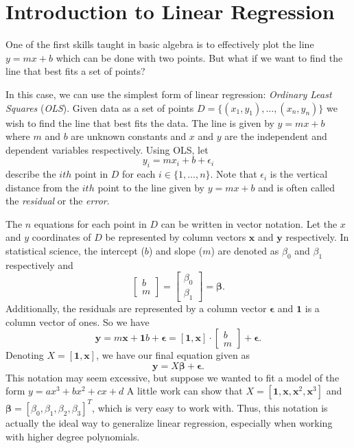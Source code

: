 \label{lab:LinearRegression}


\section*{Introduction to Linear Regression}
One of the first skills taught in basic algebra is to effectively plot the line $y=mx+b$ which can be done with two points. 
But what if we want to find the line that best fits a set of points?

In this case, we can use the simplest form of linear regression: \textit{Ordinary Least Squares} (\textit{OLS}). 
Given data as a set of points $D = \{ (x_1, y_1), \ldots, (x_n, y_n) \}$ we wish to find the line that best fits the data. 
The line is given by $y = mx+ b$ where $m$ and $b$ are unknown constants and $x$ and $y$ are the independent and dependent variables respectively. 
Using OLS, let \[ y_i = mx_i + b + \epsilon_i \] describe the $ith$ point in $D$ for each $i \in \{1, \ldots, n\}$.
Note that $\epsilon_i$ is the vertical distance from the $ith$ point to the line given by $y = mx + b$ and is often called the \textit{residual} or the \textit{error}.

The $n$ equations for each point in $D$ can be written in vector notation. 
Let the $x$ and $y$ coordinates of $D$ be represented by column vectors $\boldsymbol x$ and $\boldsymbol y$ respectively.
In statistical science, the intercept ($b$) and slope ($m$) are denoted as $\beta_0$ and $\beta_1$ respectively and 
\[ \begin{bmatrix} b \\ m \end{bmatrix} = \begin{bmatrix} \beta_0 \\ \beta_1 \end{bmatrix} = \boldsymbol\beta .\]
Additionally, the residuals are represented by a column vector  $\boldsymbol\epsilon$ and $\boldsymbol 1$ is a column vector of ones. 
So we have \[ \boldsymbol y = m \boldsymbol x + \boldsymbol 1 b + \boldsymbol\epsilon = [\boldsymbol 1, \boldsymbol x] \cdot \begin{bmatrix} b \\ m \end{bmatrix} + \boldsymbol\epsilon. \]
Denoting $X = [ \boldsymbol 1, \boldsymbol x ]$, we have our final equation given as \[ \boldsymbol y = X \boldsymbol\beta + \boldsymbol\epsilon . \]
This notation may seem excessive, but suppose we wanted to fit a model of the form $y=ax^3 + bx^2 + cx+d$
A little work can show that $X=[ \boldsymbol 1,\boldsymbol x, \boldsymbol x^2, \boldsymbol x^3]$ and $\boldsymbol\beta = [\beta_0, \beta_1, \beta_2, \beta_3]^T$, which is very easy to work with.
Thus, this notation is actually the ideal way to generalize linear regression, especially when working with higher degree polynomials.

